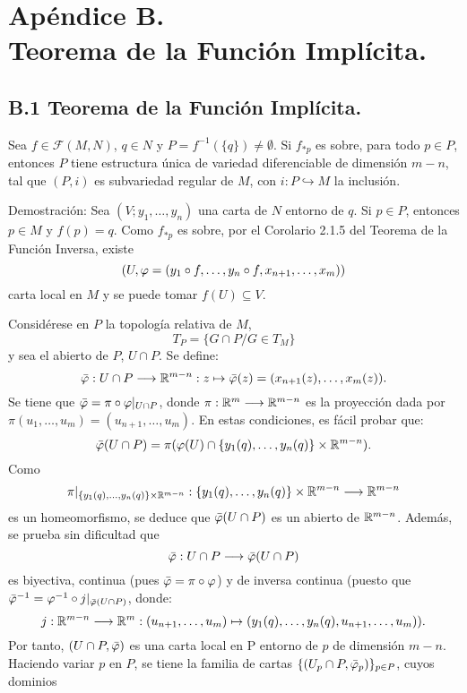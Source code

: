 \documentclass[cursovd_portada.tex]{subfiles}
\begin{document}
\chapter*{Apéndice B.\\Teorema de la Función Implícita.}
\section*{B.1 Teorema de la Función Implícita.}
\begin{teoap}
Sea $f\in\mathcal{F}(M,N)$, $q\in N$ y $P=f^{-1}(\{q\})\neq\emptyset$. Si $f_{*p}$ es sobre, para todo $p\in P$,
entonces $P$ tiene estructura única de variedad diferenciable de dimensión $m-n$, tal que $(P,i)$ es subvariedad
regular de $M$, con $i:P\hookrightarrow M$ la inclusión.
\end{teoap}
{\sc Demostración:} Sea $(V;y_1,\dots ,y_n)$ una carta de $N$ entorno de $q$. Si $p\in P$, entonces $p\in M$ y
$f(p)=q$. Como $f_{*p}$ es sobre, por el Corolario 2.1.5 del Teorema de la Función Inversa, existe
$$(U,\varphi=(y_1\circ f,\dots ,y_n\circ f,x_{n+1},\dots ,x_m))$$
carta local en $M$ y se puede tomar $f(U)\subseteq V$.
\par
Considérese en $P$ la topología relativa de $M$,
$$T_P=\{G\cap P/G\in T_M\}$$
y sea el abierto de $P$, $U\cap P$. Se define:
$$\bar{\varphi}:U\cap P\longrightarrow\mathbb{R}^{m-n}:z\mapsto\bar{\varphi}(z)=(x_{n+1}(z),\dots ,
x_m(z)).$$ \hs Se tiene que $\bar{\varphi}=\pi\circ\varphi|_{U\cap P}$, donde $\pi:\mathbb{R}^m\longrightarrow\mathbb{R}^{m-n}$ es la proyección dada
por $\pi(u_1,\dots ,u_m)=(u_{n+1},\dots ,u_m)$. En estas condiciones, es fácil probar que:
$$\bar{\varphi}(U\cap P)=\pi(\varphi(U)\cap\{y_1(q),\dots ,y_n(q)\}\times\mathbb{R}^{m-n}).$$
\hs Como
$$\pi|_{\{y_1(q),\dots ,y_n(q)\}\times\mathbb{R}^{m-n}}:\{y_1(q),\dots ,y_n(q)\}\times
\mathbb{R}^{m-n}\longrightarrow\mathbb{R}^{m-n}$$ es un homeomorfismo, se deduce que $\bar{\varphi}(U\cap P)$ es un abierto de $\mathbb{R}^{m-n}$. Además,
se prueba sin dificultad que
$$\bar{\varphi}:U\cap P\longrightarrow\bar{\varphi}(U\cap P)$$
es biyectiva, continua (pues $\bar{\varphi}=\pi\circ\varphi$) y de inversa continua (puesto que
$\bar{\varphi}^{-1}=\varphi^{-1}\circ j|_{\bar{\varphi}(U\cap P)}$, donde:
$$j:\mathbb{R}^{m-n}\longrightarrow\mathbb{R}^m:(u_{n+1},\dots ,u_m)\mapsto(y_1(q),\dots ,y_n(q),u_{n+1},
\dots ,u_m)).$$ \hs Por tanto, $(U\cap P,\bar{\varphi})$ es una carta local en P entorno de $p$ de dimensión $m-n$.
Haciendo variar $p$ en $P$, se tiene la familia de cartas $\{(U_p\cap P,\bar{\varphi}_p)\}_{p\in P}$, cuyos dominios
\end{document}

